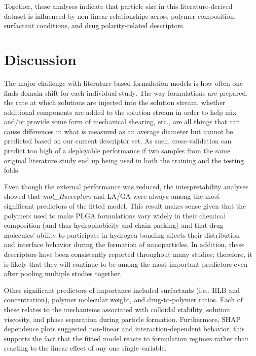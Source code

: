 \documentclass[10pt]{NSP1}
\begin{document}
Together, these analyses indicate that particle size in this literature-derived dataset is
influenced by non-linear relationships across polymer composition, surfactant conditions, and
drug polarity-related descriptors.

\section{Discussion}

The major challenge with literature-based formulation models is how often one finds domain shift
for each individual study. The way formulations are prepared, the rate at which solutions are
injected into the solution stream, whether additional components are added to the solution stream
in order to help mix and/or provide some form of mechanical shearing, etc., are all things that
can cause differences in what is measured as an average diameter but cannot be predicted based on
our current descriptor set. As such, cross-validation can predict too high of a deployable
performance if two samples from the same original literature study end up being used in both the
training and the testing folds.

Even though the external performance was reduced, the interpretability analyses showed that
\textit{mol\_Hacceptors} and LA/GA were always among the most significant predictors of the fitted
model. This result makes sense given that the polymers used to make PLGA formulations vary widely
in their chemical composition (and thus hydrophobicity and chain packing) and that drug molecules'
ability to participate in hydrogen bonding affects their distribution and interface behavior during
the formation of nanoparticles. In addition, these descriptors have been consistently reported
throughout many studies; therefore, it is likely that they will continue to be among the most
important predictors even after pooling multiple studies together.

Other significant predictors of importance included surfactants (i.e., HLB and concentration),
polymer molecular weight, and drug-to-polymer ratios. Each of these relates to the mechanisms
associated with colloidal stability, solution viscosity, and phase separation during particle
formation. Furthermore, SHAP dependence plots suggested non-linear and interaction-dependent
behavior; this supports the fact that the fitted model reacts to formulation regimes rather than
reacting to the linear effect of any one single variable.
\end{document}
